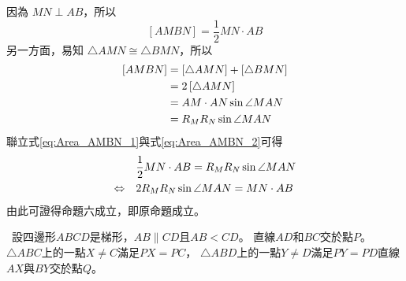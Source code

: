 \documentclass{article}
\newcommand{\INDEX}[1]{\fbox{\textbf{#1}}\ }
\begin{document}
因為 $MN\perp AB$，所以
\begin{equation}
  \left[AMBN\right]=\frac{1}{2}MN\cdot AB\label{eq:Area_AMBN_1}
\end{equation}
另一方面，易知 $\triangle{AMN}\cong\triangle{BMN}$，所以
\begin{align}
  \left[AMBN\right]&=\left[\triangle{AMN}\right]+\left[\triangle{BMN}\right]\notag\\
  &=2\left[\triangle{AMN}\right]\notag\\
  &=AM\cdot AN\sin{\angle{MAN}}\notag\\
  &=R_MR_N\sin{\angle{MAN}}\label{eq:Area_AMBN_2}
\end{align}
聯立式\eqref{eq:Area_AMBN_1}與式\eqref{eq:Area_AMBN_2}可得
\begin{align}
  &\frac{1}{2}MN\cdot AB=R_MR_N\sin{\angle{MAN}}\notag\\
  \Leftrightarrow\quad&2R_MR_N\sin{\angle{MAN}}=MN\cdot AB
\end{align}
由此可證得命題六成立，即原命題成立。

\newpage

\INDEX{問題2}設四邊形$ABCD$是梯形，$AB\parallel CD$且$AB<CD$。
直線$AD$和$BC$交於點$P$。$\triangle{ABC}$上的一點$X\neq C$滿足$PX=PC$，
$\triangle{ABD}$上的一點$Y\neq D$滿足$PY=PD$直線$AX$與$BY$交於點$Q$。
\end{document}
